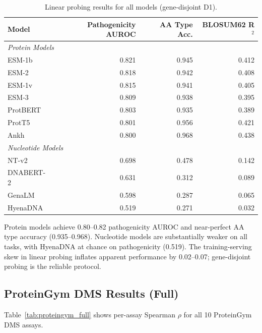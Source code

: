 \documentclass[9pt]{article}
\begin{document}
\begin{table}[h]
\centering
\caption{Linear probing results for all models (gene-disjoint D1).}
\label{tab:full_probing}
\small
\begin{tabular}{lrrr}
\toprule
\textbf{Model} & \textbf{Pathogenicity AUROC} & \textbf{AA Type Acc.} & \textbf{BLOSUM62 R$^2$} \\
\midrule
\multicolumn{4}{l}{\textit{Protein Models}} \\
ESM-1b & 0.821 & 0.945 & 0.412 \\
ESM-2 & 0.818 & 0.942 & 0.408 \\
ESM-1v & 0.815 & 0.941 & 0.405 \\
ESM-3 & 0.809 & 0.938 & 0.395 \\
ProtBERT & 0.803 & 0.935 & 0.389 \\
ProtT5 & 0.801 & 0.956 & 0.421 \\
Ankh & 0.800 & 0.968 & 0.438 \\
\midrule
\multicolumn{4}{l}{\textit{Nucleotide Models}} \\
NT-v2 & 0.698 & 0.478 & 0.142 \\
DNABERT-2 & 0.631 & 0.312 & 0.089 \\
GenaLM & 0.598 & 0.287 & 0.065 \\
HyenaDNA & 0.519 & 0.271 & 0.032 \\
\bottomrule
\end{tabular}
\end{table}

Protein models achieve 0.80--0.82 pathogenicity AUROC and near-perfect AA type accuracy (0.935--0.968). Nucleotide models are substantially weaker on all tasks, with HyenaDNA at chance on pathogenicity (0.519). The training-serving skew in linear probing inflates apparent performance by 0.02--0.07; gene-disjoint probing is the reliable protocol.

\subsection{ProteinGym DMS Results (Full)}

Table~\ref{tab:proteingym_full} shows per-assay Spearman $\rho$ for all 10 ProteinGym DMS assays.
\end{document}
